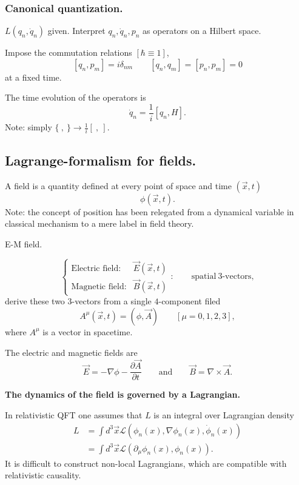\subsubsection{Canonical quantization.}

    \qquad $L(q_n, \dot{q}_n)$ given. Interpret $q_n, \dot{q}_n, p_n$ as operators on a Hilbert space.

    \qquad Impose the commutation relations $[\hbar \equiv 1]$,
            $$[q_n, p_m] = i \delta_{nm} \qquad [q_n, q_m] = [p_n, p_m] =0$$
at a fixed time.

    \qquad The time evolution of the operators is 
            $$\dot{q}_n = \frac{1}{i} [ q_n, H].$$
Note: simply $\{\ ,\ \} \rightarrow \frac{1}{i}[\ ,\ ]$.

\subsection{Lagrange-formalism for fields.}

\qquad A field is a quantity defined at every point of space and time $(\vec{x},t)$
            $$\phi(\vec{x},t).$$
Note: the concept of position has been relegated from a dynamical variable in classical mechanism to a mere label in field theory.

\begin{example} E-M field.

    $$\begin{cases}
        \text{Electric field}: &\vec{E}(\vec{x},t)\\
        \text{Magnetic field}: &\vec{B}(\vec{x},t)
    \end{cases}:\qquad \text{spatial}\ 3\text{-vectors},$$
derive these two $3$-vectors from a single $4$-component filed
            $$A^\mu(\vec{x},t) = (\phi, \vec{A}) \qquad [\mu=0,1,2,3],$$
where $A^\mu$ is a vector in spacetime.

    The electric and magnetic fields are
        $$\vec{E}=-\nabla \phi - \frac{\partial \vec{A}}{\partial t} \qquad \text{and} \qquad \vec{B}= \nabla \times \vec{A}.$$
\end{example}

\qquad \textbf{The dynamics of the field is governed by a Lagrangian.}

\qquad In relativistic QFT one assumes that $L$ is an integral over Lagrangian density
            \begin{align*}
                L &= \int d^3\vec{x} \mathcal{L}(\phi_n(x), \nabla \phi_n(x), \dot{\phi}_n(x))\\
                    &= \int d^3\vec{x} \mathcal{L}(\partial_\mu \phi_n(x), \phi_n(x)).
            \end{align*}
It is difficult to construct non-local Lagrangians, which are compatible with relativistic causality.

